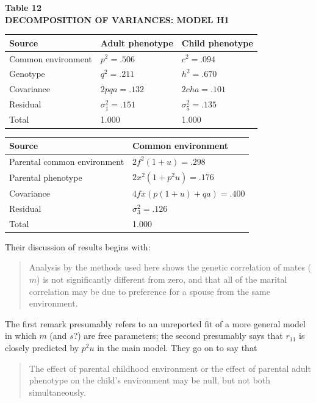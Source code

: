 ﻿\documentclass[12pt]{article}
\begin{document}
\begin{center}
\textbf{Table 12}\\
\textbf{DECOMPOSITION OF VARIANCES: MODEL H1}
\end{center}
\begin{center}
\begin{tabular}{l l l}
\hline
Source & Adult phenotype & Child phenotype \\
\hline
Common environment & $p^2=.506$ & $c^2=.094$ \\
Genotype & $q^2=.211$ & $h^2=.670$ \\
Covariance & $2pqa=.132$ & $2cha=.101$ \\
Residual & $\sigma_1^2=.151$ & $\sigma_5^2=.135$ \\
\hline
Total & 1.000 & 1.000 \\
\hline
\end{tabular}
\qquad
\begin{tabular}{l l}
\hline
Source & Common environment \\
\hline
Parental common environment & $2f^2(1+u)=.298$ \\
Parental phenotype & $2x^2(1+p^2u)=.176$ \\
Covariance & $4fx(p(1+u)+qa)=.400$ \\
Residual & $\sigma_3^2=.126$ \\
\hline
Total & 1.000 \\
\hline
\end{tabular}
\end{center}

Their discussion of results begins with:

\begin{quote}
Analysis by the methods used here shows the genetic correlation of mates ($m$) is not significantly different from zero, and that all of the marital correlation may be due to preference for a spouse from the same environment.
\end{quote}

The first remark presumably refers to an unreported fit of a more general model in which $m$ (and $s$?) are free parameters; the second presumably says that $r_{11}$ is closely predicted by $p^2u$ in the main model. They go on to say that

\begin{quote}
The effect of parental childhood environment or the effect of parental adult phenotype on the child's environment may be null, but not both simultaneously.
\end{quote}
\end{document}
